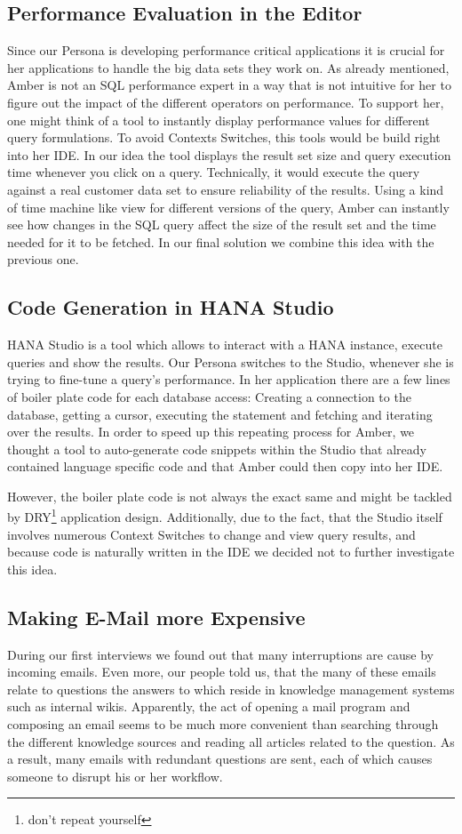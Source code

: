 \subsection{Performance Evaluation in the Editor}
Since our Persona is developing performance critical applications it is crucial for her applications to handle the big data sets they work on. As already mentioned, Amber is not an SQL performance expert in a way that is not intuitive for her to figure out the impact of the different operators on performance. To support her, one might think of a tool to instantly display performance values for different query formulations. To avoid Contexts Switches, this tools would be build right into her IDE. In our idea the tool displays the result set size and query execution time whenever you click on a query. Technically, it would execute the query against a real customer data set to ensure reliability of the results.
Using a kind of time machine like view for different versions of the query, Amber can instantly see how changes in the SQL query affect the size of the result set and the time needed for it to be fetched.
In our final solution we combine this idea with the previous one.

\subsection{Code Generation in HANA Studio}
HANA Studio is a tool which allows to interact with a HANA instance, execute queries and show the results. Our Persona switches to the Studio, whenever she is trying to fine-tune a query's performance. In her application there are a few lines of boiler plate code for each database access: Creating a connection to the database, getting a cursor, executing the statement and fetching and iterating over the results. In order to speed up this repeating process for Amber, we thought a tool to auto-generate code snippets within the Studio that already contained language specific code and that Amber could then copy into her IDE.

However, the boiler plate code is not always the exact same and might be tackled by DRY\footnote{don't repeat yourself} application design.
Additionally, due to the fact, that the Studio itself involves numerous Context Switches to change and view query results, and because code is naturally written in the IDE we decided not to further investigate this idea. 

\subsection{Making E-Mail more Expensive}
During our first interviews we found out that many interruptions are cause by incoming emails. Even more, our people told us, that the many of these emails relate to questions the answers to which reside in knowledge management systems such as internal wikis. Apparently, the act of opening a mail program and composing an email seems to be much more convenient than searching through the different knowledge sources and reading all articles related to the question. As a result, many emails with redundant questions are sent, each of which causes someone  to disrupt his or her workflow.

